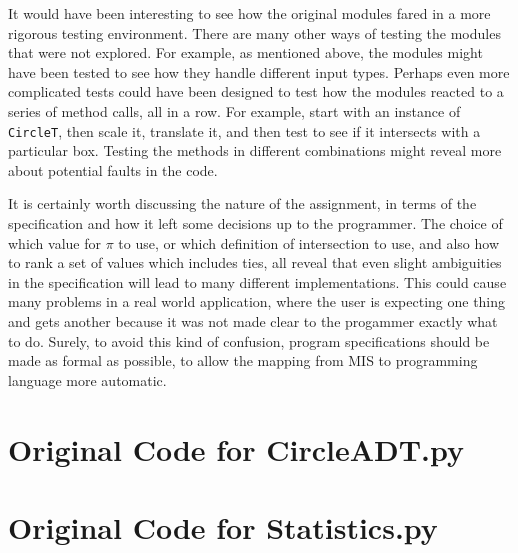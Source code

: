 \documentclass[12pt]{article}
\begin{document}
It would have been interesting to see how the original modules fared in a more rigorous testing environment. There are many other ways of testing the modules that were not explored. For example, as mentioned above, the modules might have been tested to see how they handle different input types. Perhaps even more complicated tests could have been designed to test how the modules reacted to a series of method calls, all in a row. For example, start with an instance of {\tt CircleT}, then scale it, translate it, and then test to see if it intersects with a particular box. Testing the methods in different combinations might reveal more about potential faults in the code. 

It is certainly worth discussing the nature of the assignment, in terms of the specification and how it left some decisions up to the programmer. The choice of which value for $\pi$ to use, or which definition of intersection to use, and also how to rank a set of values which includes ties, all reveal that even slight ambiguities in the specification will lead to many different implementations. This could cause many problems in a real world application, where the user is expecting one thing and gets another because it was not made clear to the progammer exactly what to do. Surely, to avoid this kind of confusion, program specifications should be made as formal as possible, to allow the mapping from MIS to programming language more automatic. 

\newpage

\appendix

\lstset{language=Python, basicstyle=\tiny,breaklines=true,showspaces=false,showstringspaces=false,breakatwhitespace=true}

\def\thesection{\Alph{section}} 

\section{Original Code for CircleADT.py} \label{CircleSect}

\noindent 

\newpage

\section{Original Code for Statistics.py} \label{CircleSect}

\noindent 
\end{document}

